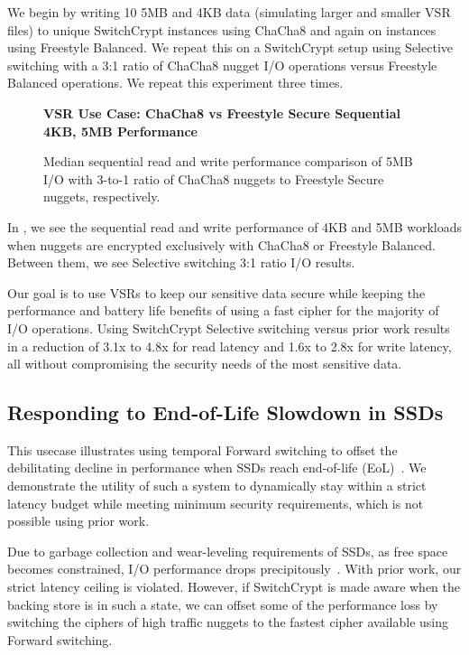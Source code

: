We begin by writing 10 5MB and 4KB data (simulating larger and smaller VSR
files) to unique SwitchCrypt instances using ChaCha8 and again on instances
using Freestyle Balanced. We repeat this on a SwitchCrypt setup using Selective
switching with a 3:1 ratio of ChaCha8 nugget I/O operations versus Freestyle
Balanced operations. We repeat this experiment three times.

\begin{figure}[ht] \textbf{VSR Use Case: ChaCha8 vs Freestyle Secure Sequential
4KB, 5MB Performance}\par\medskip
   \centering
   {} \caption{Median sequential read and
   write performance comparison of 5MB I/O with 3-to-1 ratio of ChaCha8 nuggets
   to Freestyle Secure nuggets, respectively.}
  \label{fig:usecase-vsr-bar}
\end{figure}

In , we see the sequential read and write performance of
4KB and 5MB workloads when nuggets are encrypted exclusively with ChaCha8 or
Freestyle Balanced. Between them, we see Selective switching 3:1 ratio I/O
results.

Our goal is to use VSRs to keep our sensitive data secure while keeping the
performance and battery life benefits of using a fast cipher for the majority of
I/O operations. Using SwitchCrypt Selective switching versus prior work results
in a reduction of 3.1x to 4.8x for read latency and 1.6x to 2.8x for write
latency, all without compromising the security needs of the most sensitive data.

\subsection{Responding to End-of-Life Slowdown in SSDs}\label{subsec:uc3}

This usecase illustrates using temporal Forward switching to offset the
debilitating decline in performance when SSDs reach end-of-life
(EoL)~\cite{SSDEOL1}. We demonstrate the utility of such a system to dynamically
stay within a strict latency budget while meeting minimum security requirements,
which is not possible using prior work.

Due to garbage collection and wear-leveling requirements of SSDs, as free space
becomes constrained, I/O performance drops precipitously~\cite{SSDEOL1}. With
prior work, our strict latency ceiling is violated. However, if SwitchCrypt is
made aware when the backing store is in such a state, we can offset some of the
performance loss by switching the ciphers of high traffic nuggets to the fastest
cipher available using Forward switching.

